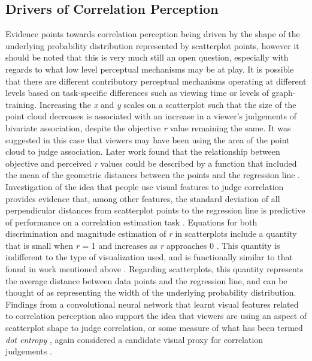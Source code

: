 \documentclass[manuscript, review, anonymous, screen]{acmart}
\begin{document}
\hypertarget{sec-drivers}{%
\subsection{Drivers of Correlation Perception}\label{sec-drivers}}

Evidence points towards correlation perception being driven by the shape
of the underlying probability distribution represented by scatterplot
points, however it should be noted that this is very much still an open
question, especially with regards to what low level perceptual
mechanisms may be at play. It is possible that there are different
contributory perceptual mechanisms operating at different levels based
on task-specific differences such as viewing time or levels of
graph-training. Increasing the \emph{x} and \emph{y} scales on a
scatterplot such that the size of the point cloud decreases
\citep{cleveland_1982} is associated with an increase in a viewer's
judgements of bivariate association, despite the objective \emph{r}
value remaining the same. It was suggested in this case that viewers may
have been using the area of the point cloud to judge association. Later
work found that the relationship between objective and perceived
\emph{r} values could be described by a function that included the mean
of the geometric distances between the points and the regression line
\citep{meyer_1997}. Investigation of the idea that people use visual
features to judge correlation provides evidence that, among other
features, the standard deviation of all perpendicular distances from
scatterplot points to the regression line is predictive of performance
on a correlation estimation task \citep{yang_2019}. Equations for both
discrimination and magnitude estimation of \emph{r} in scatterplots
include a quantity that is small when \emph{r} = 1 and increases as
\emph{r} approaches 0 \citep{rensink_2017}. This quantity is indifferent
to the type of visualization used, and is functionally similar to that
found in work mentioned above
\citep{cleveland_1982, meyer_1997, yang_2019}. Regarding scatterplots,
this quantity represents the average distance between data points and
the regression line, and can be thought of as representing the width of
the underlying probability distribution. Findings from a convolutional
neural network that learnt visual features related to correlation
perception also support the idea that viewers are using an aspect of
scatterplot shape to judge correlation, or some measure of what has been
termed \emph{dot entropy} \citep{yang_2023}, again considered a
candidate visual proxy for correlation judgements
\citep{rensink_2017, rensink_2022}.
\end{document}
